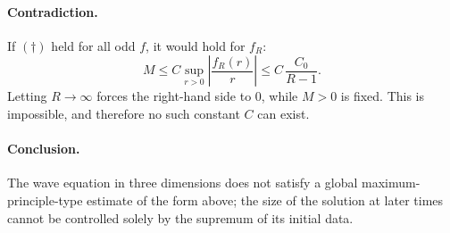 \documentclass[12pt,a4paper]{article}
\theoremstyle{plain}
\theoremstyle{definition}
\theoremstyle{remark}
\theoremstyle{remark}
\begin{document}
\paragraph{\textbf{Contradiction.}}
If $(\dagger)$ held for all odd $f$, it would hold for $f_R$:
\[
M \le C \sup_{r>0}\left|\frac{f_R(r)}{r}\right|
\le C\,\frac{C_0}{R-1}.
\]
Letting $R\to\infty$ forces the right-hand side to $0$, while $M>0$ is
fixed. This is impossible, and therefore no such constant $C$ can exist.

\paragraph{\textbf{Conclusion.}}
The wave equation in three dimensions does not satisfy a global
maximum-principle-type estimate of the form above; the size of the
solution at later times cannot be controlled solely by the supremum of
its initial data.
\end{document}
